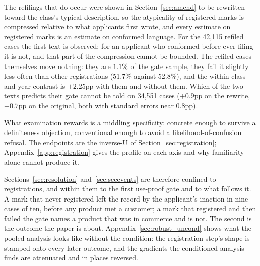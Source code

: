 The refilings that do occur were shown in Section~\ref{sec:amend} to be
rewritten toward the class's typical description, so the atypicality of
registered marks is compressed relative to what applicants first wrote,
and every estimate on registered marks is an estimate on conformed
language. For the 42{,}115 refiled cases the first text is observed; for an
applicant who conformed before ever filing it is not, and that part of the
compression cannot be bounded. The refiled cases themselves move nothing:
they are $1.1$\% of the gate sample, they fail it slightly less often than
other registrations (51.7\% against 52.8\%), and the within-class-and-year
contrast is $+2.25$pp with them and without them. Which of the two texts
predicts their gate cannot be told on 34{,}551 cases ($+0.9$pp on the
rewrite, $+0.7$pp on the original, both with standard errors near
$0.8$pp).

What examination rewards is a middling specificity: concrete enough to
survive a definiteness objection, conventional enough to avoid a
likelihood-of-confusion refusal. The endpoints are the inverse-U of
Section~\ref{sec:registration}; Appendix~\ref{app:registration} gives the
profile on each axis and why familiarity alone cannot produce it.


Sections~\ref{sec:resolution} and~\ref{sec:secevents} are therefore
confined to registrations, and within them to the first use-proof gate and to
what follows it. A mark that never registered left the record by the
applicant's inaction in nine cases of ten, before any product met a
customer; a mark that registered and then failed the gate names a product
that was in commerce and is not. The second is the outcome the paper is
about. Appendix~\ref{sec:robust_uncond} shows what the pooled analysis looks like
without the condition: the registration step's shape is stamped onto every
later outcome, and the gradients the conditioned analysis finds are
attenuated and in places reversed.
